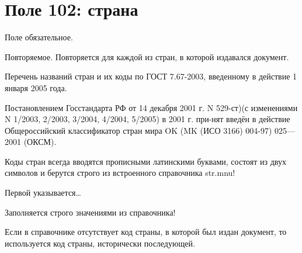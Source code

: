 \chapter*{Поле 102: страна}

Поле обязательное.

Повторяемое. Повторяется для каждой из стран, в которой издавался документ.

Перечень названий стран и их коды по ГОСТ 7.67-2003, введенному в действие 1 января 2005 года.

Постановлением Госстандарта РФ от 14 декабря 2001 г. N 529-ст)(с изменениями N 1/2003, 2/2003, 3/2004, 4/2004, 5/2005) в 2001 г. при-нят введён в действие Общероссийский классификатор стран мира OK (MK (ИСО 3166) 004-97) 025—2001 (ОКСМ).

Коды стран всегда вводятся прописными латинскими буквами, состоят из двух символов и берутся строго из встроенного справочника str.mnu!

Первой указывается… %

Заполняется строго значениями из справочника!

Если в справочнике отсутствует код страны, в которой был издан документ, то используется код страны, исторически последующей.
